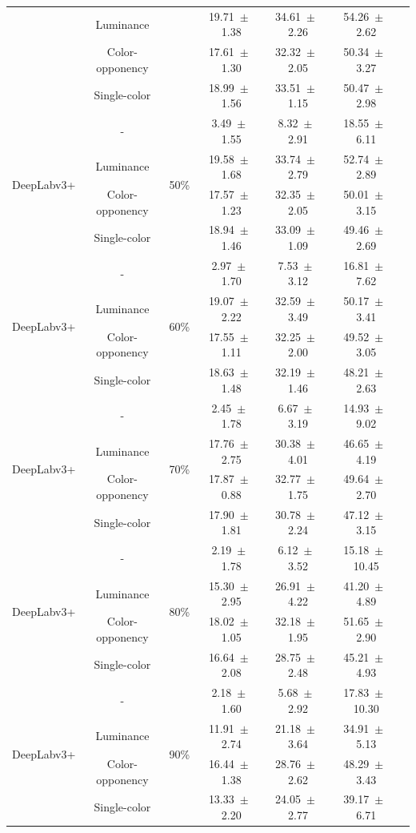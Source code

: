 \begin{table}[h]
\begin{tabular}{@{}lccc ccc@{}}
& Luminance & & 19.71~$\pm$~1.38 & 34.61~$\pm$~2.26 & 54.26~$\pm$~2.62 \\
& Color-opponency & & 17.61~$\pm$~1.30 & 32.32~$\pm$~2.05 & 50.34~$\pm$~3.27 \\
& Single-color & & 18.99~$\pm$~1.56 & 33.51~$\pm$~1.15 & 50.47~$\pm$~2.98 \\
\midrule
\multirow{4}{*}{DeepLabv3+} & - & \multirow{4}{*}{50\%} & 3.49~$\pm$~1.55 & 8.32~$\pm$~2.91 & 18.55~$\pm$~6.11 \\
& Luminance & & 19.58~$\pm$~1.68 & 33.74~$\pm$~2.79 & 52.74~$\pm$~2.89 \\
& Color-opponency & & 17.57~$\pm$~1.23 & 32.35~$\pm$~2.05 & 50.01~$\pm$~3.15 \\
& Single-color & & 18.94~$\pm$~1.46 & 33.09~$\pm$~1.09 & 49.46~$\pm$~2.69 \\
\midrule
\multirow{4}{*}{DeepLabv3+} & - & \multirow{4}{*}{60\%} & 2.97~$\pm$~1.70 & 7.53~$\pm$~3.12 & 16.81~$\pm$~7.62 \\
& Luminance & & 19.07~$\pm$~2.22 & 32.59~$\pm$~3.49 & 50.17~$\pm$~3.41 \\
& Color-opponency & & 17.55~$\pm$~1.11 & 32.25~$\pm$~2.00 & 49.52~$\pm$~3.05 \\
& Single-color & & 18.63~$\pm$~1.48 & 32.19~$\pm$~1.46 & 48.21~$\pm$~2.63 \\
\midrule
\multirow{4}{*}{DeepLabv3+} & - & \multirow{4}{*}{70\%} & 2.45~$\pm$~1.78 & 6.67~$\pm$~3.19 & 14.93~$\pm$~9.02 \\
& Luminance & & 17.76~$\pm$~2.75 & 30.38~$\pm$~4.01 & 46.65~$\pm$~4.19 \\
& Color-opponency & & 17.87~$\pm$~0.88 & 32.77~$\pm$~1.75 & 49.64~$\pm$~2.70 \\
& Single-color & & 17.90~$\pm$~1.81 & 30.78~$\pm$~2.24 & 47.12~$\pm$~3.15 \\
\midrule
\multirow{4}{*}{DeepLabv3+} & - & \multirow{4}{*}{80\%} & 2.19~$\pm$~1.78 & 6.12~$\pm$~3.52 & 15.18~$\pm$~10.45 \\
& Luminance & & 15.30~$\pm$~2.95 & 26.91~$\pm$~4.22 & 41.20~$\pm$~4.89 \\
& Color-opponency & & 18.02~$\pm$~1.05 & 32.18~$\pm$~1.95 & 51.65~$\pm$~2.90 \\
& Single-color & & 16.64~$\pm$~2.08 & 28.75~$\pm$~2.48 & 45.21~$\pm$~4.93 \\
\midrule
\multirow{4}{*}{DeepLabv3+} & - & \multirow{4}{*}{90\%} & 2.18~$\pm$~1.60 & 5.68~$\pm$~2.92 & 17.83~$\pm$~10.30 \\
& Luminance & & 11.91~$\pm$~2.74 & 21.18~$\pm$~3.64 & 34.91~$\pm$~5.13 \\
& Color-opponency & & 16.44~$\pm$~1.38 & 28.76~$\pm$~2.62 & 48.29~$\pm$~3.43 \\
& Single-color & & 13.33~$\pm$~2.20 & 24.05~$\pm$~2.77 & 39.17~$\pm$~6.71 \\
\midrule
\bottomrule
\end{tabular}
\label{tab:sparse_results_deeplabv3plus_dark_zurich}
\end{table}